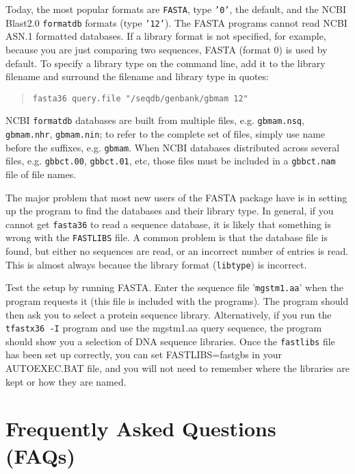\documentclass[11pt]{article}
\begin{document}
Today, the most popular formats are \texttt{FASTA}, type \texttt{'0'},
the default, and the NCBI Blast2.0 \texttt{formatdb} formats (type
\texttt{'12'}).  The FASTA programs cannot read NCBI ASN.1 formatted databases.
If a library format is not specified, for example, because
you are just comparing two sequences, FASTA (format 0) is used by
default. To specify a library type on the command line, add it to the
library filename and surround the filename and library type in quotes:
\begin{quote}
\begin{verbatim}
fasta36 query.file "/seqdb/genbank/gbmam 12"
\end{verbatim}
\end{quote}
NCBI \texttt{formatdb} databases are built from multiple files,
e.g. \texttt{gbmam.nsq}, \texttt{gbmam.nhr}, \texttt{gbmam.nin}; to
refer to the complete set of files, simply use name before the
suffixes, e.g. \texttt{gbmam}.  When NCBI databases distributed across
several files, e.g. \texttt{gbbct.00}, \texttt{gbbct.01}, etc, those
files must be included in a \texttt{gbbct.nam} file of file names.

The major problem that most new users of the FASTA package have is in
setting up the program to find the databases and their library type.
In general, if you cannot get \texttt{fasta36} to read a sequence
database, it is likely that something is wrong with the \texttt{FASTLIBS}
file.  A common problem is that the database file is found, but either
no sequences are read, or an incorrect number of entries is read.
This is almost always because the library format (\texttt{libtype}) is
incorrect.

Test the setup by running FASTA.  Enter the sequence
file '\texttt{mgstm1.aa}' when the program requests it (this file is
included with the programs).  The program should then ask you to
select a protein sequence library.  Alternatively, if you run the
\texttt{tfastx36 -I} program and use the mgstm1.aa query sequence, the program
should show you a selection of DNA sequence libraries.
Once the \texttt{fastlibs} file has been set up correctly, you can
set FASTLIBS=fastgbs in your AUTOEXEC.BAT file, and you will not need to
remember where the libraries are kept or how they are named.

\section{Frequently Asked Questions (FAQs)}
\end{document}
